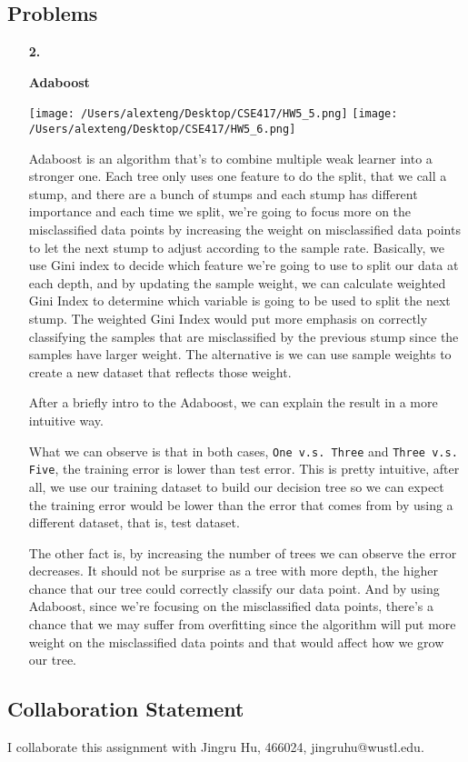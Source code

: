 \documentclass[11pt]{article}
\begin{document}
\subsection*{Problems}
\begin{enumerate}

\item[\textbf{2.}]

\textbf{Adaboost}

\texttt{[image: /Users/alexteng/Desktop/CSE417/HW5\_5.png]}
\texttt{[image: /Users/alexteng/Desktop/CSE417/HW5\_6.png]}

Adaboost is an algorithm that's to combine multiple weak learner into a stronger one. Each tree only uses one feature to do the split, that we call a stump, and there are a bunch of stumps and each stump has different importance and each time we split, we're going to focus more on the misclassified data points by increasing the weight on misclassified data points to let the next stump to adjust according to the sample rate. Basically, we use Gini index to decide which feature we're going to use to split our data at each depth, and by updating the sample weight, we can calculate weighted Gini Index to determine which variable is going to be used to split the next stump.  The weighted Gini Index would put more emphasis on correctly classifying the samples that are misclassified by the previous stump since the samples have larger weight.  The alternative is we can use sample weights to create a new dataset that reflects those weight. 

After a briefly intro to the Adaboost, we can explain the result in a more intuitive way.

What we can observe is that in both cases, \texttt{One v.s. Three} and \texttt{Three v.s. Five}, the training error is lower than test error. This is pretty intuitive, after all, we use our training dataset to build our decision tree so we can expect the training error would be lower than the error that comes from by using a different dataset, that is, test dataset. 

The other fact is, by increasing the number of trees we can observe the error decreases. It should not be surprise as a tree with more depth, the higher chance that our tree could correctly classify our data point. And by using Adaboost, since we're focusing on the misclassified data points, there's a chance that we may suffer from overfitting since the algorithm will put more weight on the misclassified data points and that would affect how we grow our tree. 

\end{enumerate}
\pagebreak


\subsection*{Collaboration Statement}

I collaborate this assignment with Jingru Hu, 466024, jingruhu@wustl.edu.
\end{document}
